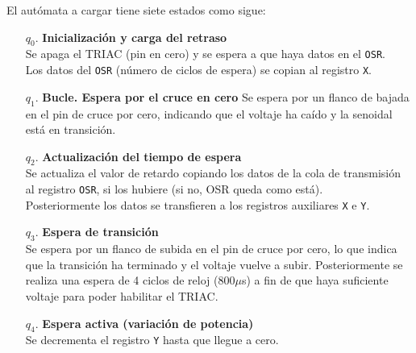El autómata a cargar tiene siete estados como sigue:
\begin{enumerate}
	\item[\(q_0\).] \textbf{Inicialización y carga del retraso}\\
		Se apaga el TRIAC (pin en cero) y se espera a que haya datos en el \texttt{OSR}.\\
		Los datos del \texttt{OSR} (número de ciclos de espera) se copian al registro \texttt{X}.
		\par\noindent\begin{minipage}{\linewidth}
		\end{minipage}

	\item[\(q_1\).] \textbf{Bucle. Espera por el cruce en cero}
		Se espera por un flanco de bajada en el pin de cruce por cero, indicando que el voltaje ha caído y la senoidal está en transición.

	\item[\(q_2\).]  \textbf{Actualización del tiempo de espera}\\
		Se actualiza el valor de retardo copiando los datos de la cola de transmisión al registro \texttt{OSR}, si los hubiere (si no, OSR queda como está).\\
		Posteriormente los datos se transfieren a los registros auxiliares \texttt{X} e \texttt{Y}.

	\item[\(q_3\).]  \textbf{Espera de transición}\\
		Se espera por un flanco de subida en el pin de cruce por cero, lo que indica que la transición ha terminado y el voltaje vuelve a subir.
		Posteriormente se realiza una espera de 4 ciclos de reloj (800\(\mu{}\)s) a fin de que haya suficiente voltaje para poder habilitar el TRIAC.

	\item[\(q_4\).]  \textbf{Espera activa (variación de potencia)}\\
		Se decrementa el registro \texttt{Y} hasta que llegue a cero.


\end{enumerate}
